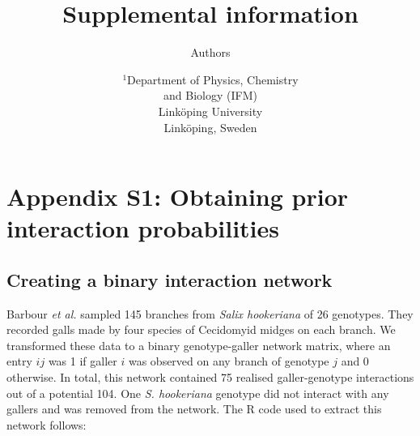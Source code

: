 \documentclass[12pt]{article}
\title{Supplemental information}
\author{Authors}
\date{\small$^1$Department of Physics, Chemistry\\ 
and Biology (IFM)\\ 
Link\"{o}ping University\\
Link\"{o}ping, Sweden\\
 }
\begin{document}
 
\maketitle 
\raggedright
\setlength{\parindent}{15pt} 
\clearpage

\section*{Appendix S1: Obtaining prior interaction probabilities}

    \subsection*{Creating a binary interaction network}

      Barbour \emph{et al.} sampled 145 branches from 
      \emph{Salix hookeriana} of 26 genotypes. They recorded galls 
      made by four species of Cecidomyid midges on each branch. We 
      transformed these data to a binary genotype-galler network 
      matrix, where an entry $ij$ was 1 if galler $i$ was observed 
      on any branch of genotype $j$ and 0 otherwise. In total, this 
      network contained 75 realised galler-genotype interactions 
      out of a potential 104. One \emph{S. hookeriana} genotype did
      not interact with any gallers and was removed from the network.
      The R code used to extract this 
      network follows:
\end{document}
